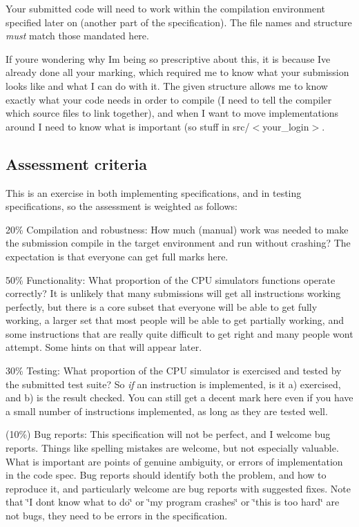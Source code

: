 Your submitted code will need to work within the compilation environment specified later on (another part of the specification). The file names and structure {\itshape must} match those mandated here.

If you\textquotesingle{}re wondering why I\textquotesingle{}m being so prescriptive about this, it is because I\textquotesingle{}ve already done all your marking, which required me to know what your submission looks like and what I can do with it. The given structure allows me to know exactly what your code needs in order to compile (I need to tell the compiler which source files to link together), and when I want to move implementations around I need to know what is important (so stuff in src/$<$your\+\_\+login$>$.

\subsection*{Assessment criteria }

This is an exercise in both implementing specifications, and in testing specifications, so the assessment is weighted as follows\+:


\begin{DoxyItemize}
\item 20\% Compilation and robustness\+: How much (manual) work was needed to make the submission compile in the target environment and run without crashing? The expectation is that everyone can get full marks here.
\item 50\% Functionality\+: What proportion of the C\+P\+U simulator\textquotesingle{}s functions operate correctly? It is unlikely that many submissions will get all instructions working perfectly, but there is a core subset that everyone will be able to get fully working, a larger set that most people will be able to get partially working, and some instructions that are really quite difficult to get right and many people won\textquotesingle{}t attempt. Some hints on that will appear later.
\item 30\% Testing\+: What proportion of the C\+P\+U simulator is exercised and tested by the submitted test suite? So {\itshape if} an instruction is implemented, is it a) exercised, and b) is the result checked. You can still get a decent mark here even if you have a small number of instructions implemented, as long as they are tested well.
\item (10\%) Bug reports\+: This specification will not be perfect, and I welcome bug reports. Things like spelling mistakes are welcome, but not especially valuable. What is important are points of genuine ambiguity, or errors of implementation in the code spec. Bug reports should identify both the problem, and how to reproduce it, and particularly welcome are bug reports with suggested fixes. Note that \char`\"{}\+I don\textquotesingle{}t know
  what to do\char`\"{} or \char`\"{}my program crashes\char`\"{} or \char`\"{}this is too hard\char`\"{} are not bugs, they need to be errors in the specification.
\end{DoxyItemize}

